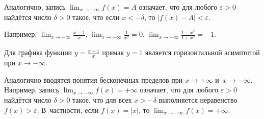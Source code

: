 Аналогично, запись $\displaystyle \lim_{x \to -\infty} f(x) = A$ означает,
что для любого $\varepsilon > 0$ найдётся число $\delta > 0$ такое,
что если $x < -\delta$, то $\left| f(x) - A \right| < \varepsilon$.

Например, $\displaystyle \lim_{x \to -\infty} \frac{x-1}{x}$,
$\displaystyle \lim_{x \to -\infty} \frac{1}{x^{2}} = 0$,
$\displaystyle \lim_{x \to -\infty} \frac{1-x^{2}}{1+x^{2}} = -1$.

Для графика функции $\displaystyle y = \frac{x-1}{x}$ прямая $y = 1$
является горизонтальной асимптотой при $x \to -\infty$.

Аналогично вводятся понятия бесконечных пределов при $x \to +\infty$
и~$x \to -\infty$.
Например, запись $\displaystyle \lim_{x \to -\infty} f(x) = +\infty$
означает, что для любого $\varepsilon > 0$ найдётся число $\delta > 0$ такое,
что для всех $x > -\delta$ выполняется неравенство $f(x) > \varepsilon$.
В~частности, если $f(x) = |x|$, то $\displaystyle \lim_{x \to -\infty} f(x) = +\infty$.


